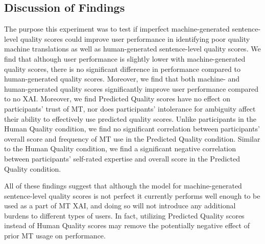 \subsection{Discussion of Findings} 

The purpose this experiment was to test if imperfect machine-generated sentence-level quality scores could improve user performance in identifying poor quality machine translations as well as human-generated sentence-level quality scores. We find that although user performance is slightly lower with machine-generated quality scores, there is no significant difference in performance compared to human-generated quality scores. Moreover, we find that both machine- and human-generated quality scores significantly improve user performance compared to no XAI. 
Moreover, we find Predicted Quality scores have no effect on participants' trust of MT, nor does participants' intolerance for ambiguity affect their ability to effectively use predicted quality scores. Unlike participants in the Human Quality condition, we find no significant correlation between participants' overall score and frequency of MT use in the Predicted Quality condition. Similar to the Human Quality condition, we find a significant negative correlation between participants' self-rated expertise and overall score in the Predicted Quality condition.     

All of these findings suggest that although the model for machine-generated sentence-level quality scores is not perfect it currently performs well enough to be used as a part of MT XAI, and doing so will not introduce any additional burdens to different types of users. In fact, utilizing Predicted Quality scores instead of Human Quality scores may remove the potentially negative effect of prior MT usage on performance.  


